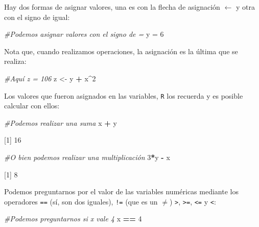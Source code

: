 \documentclass[
]{book}
\newenvironment{Shaded}{\begin{snugshade}}{\end{snugshade}}
\newcommand{\CommentTok}[1]{\textcolor[rgb]{0.56,0.35,0.01}{\textit{#1}}}
\newcommand{\DecValTok}[1]{\textcolor[rgb]{0.00,0.00,0.81}{#1}}
\newcommand{\NormalTok}[1]{#1}
\newcommand{\OperatorTok}[1]{\textcolor[rgb]{0.81,0.36,0.00}{\textbf{#1}}}
\newcommand{\StringTok}[1]{\textcolor[rgb]{0.31,0.60,0.02}{#1}}
\begin{document}
Hay dos formas de asignar valores, una es con la flecha de asignación \(\leftarrow\) y otra con el signo de igual:

\begin{Shaded}
\begin{Highlighting}[]
\CommentTok{#Podemos asignar valores con el signo de =}
\NormalTok{y =}\StringTok{ }\DecValTok{6}
\end{Highlighting}
\end{Shaded}

Nota que, cuando realizamos operaciones, la asignación es la última que se realiza:

\begin{Shaded}
\begin{Highlighting}[]
\CommentTok{#Aquí z = 106}
\NormalTok{z <-}\StringTok{ }\NormalTok{y }\OperatorTok{+}\StringTok{ }\NormalTok{x}\OperatorTok{^}\DecValTok{2}
\end{Highlighting}
\end{Shaded}

Los valores que fueron asignados en las variables, \texttt{R} los recuerda y es posible calcular con ellos:

\begin{Shaded}
\begin{Highlighting}[]
\CommentTok{#Podemos realizar una suma}
\NormalTok{x }\OperatorTok{+}\StringTok{ }\NormalTok{y}
\end{Highlighting}
\end{Shaded}

{[}1{]} 16

\begin{Shaded}
\begin{Highlighting}[]
\CommentTok{#O bien podemos realizar una multiplicación}
\DecValTok{3}\OperatorTok{*}\NormalTok{y }\OperatorTok{-}\StringTok{ }\NormalTok{x}
\end{Highlighting}
\end{Shaded}

{[}1{]} 8

Podemos preguntarnos por el valor de las variables numéricas mediante los operadores \texttt{==} (sí, son dos iguales), \texttt{!=} (que es un \(\neq\)) \texttt{\textgreater{}}, \texttt{\textgreater{}=}, \texttt{\textless{}=} y \texttt{\textless{}}:

\begin{Shaded}
\begin{Highlighting}[]
\CommentTok{#Podemos preguntarnos si x vale 4}
\NormalTok{x }\OperatorTok{==}\StringTok{ }\DecValTok{4}
\end{Highlighting}
\end{Shaded}
\end{document}

